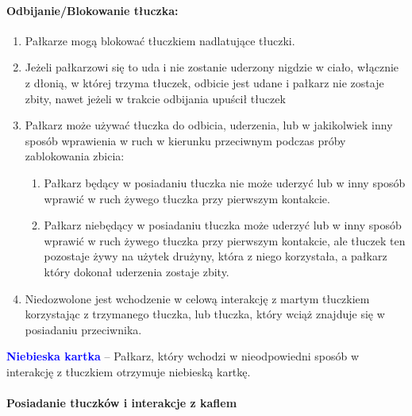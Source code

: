 \documentclass[12pt]{article}
\newcommand\bluecard[1]{\bgroup\textcolor{blue}{\textbf{#1}}}
\begin{document}
\paragraph{Odbijanie/Blokowanie tłuczka:}

\begin{enumerate}
	\item
	      Pałkarze mogą blokować tłuczkiem nadlatujące tłuczki.
	\item
	      Jeżeli pałkarzowi się to uda i nie zostanie uderzony nigdzie w ciało,
	      włącznie z dłonią, w której trzyma tłuczek, odbicie jest udane i
	      pałkarz nie zostaje zbity, nawet jeżeli w trakcie odbijania upuścił
	      tłuczek
	\item
	      Pałkarz może używać tłuczka do odbicia, uderzenia, lub w jakikolwiek
	      inny sposób wprawienia w ruch w kierunku przeciwnym podczas próby
	      zablokowania zbicia:

	      \begin{enumerate}
		      \item
		            Pałkarz będący w posiadaniu tłuczka nie może uderzyć lub w inny
		            sposób wprawić w ruch żywego tłuczka przy pierwszym kontakcie.
		      \item
		            Pałkarz niebędący w posiadaniu tłuczka może uderzyć lub w inny
		            sposób wprawić w ruch żywego tłuczka przy pierwszym kontakcie, ale
		            tłuczek ten pozostaje żywy na użytek drużyny, która z niego
		            korzystała, a pałkarz który dokonał uderzenia zostaje zbity.
	      \end{enumerate}
	\item
	      Niedozwolone jest wchodzenie w celową interakcję z martym tłuczkiem
	      korzystając z trzymanego tłuczka, lub tłuczka, który wciąż znajduje
	      się w posiadaniu przeciwnika.
\end{enumerate}

\bluecard{Niebieska kartka} -- Pałkarz, który wchodzi w nieodpowiedni sposób
w interakcję z tłuczkiem otrzymuje niebieską kartkę.

\paragraph{Posiadanie tłuczków i interakcje z kaflem}
\end{document}
